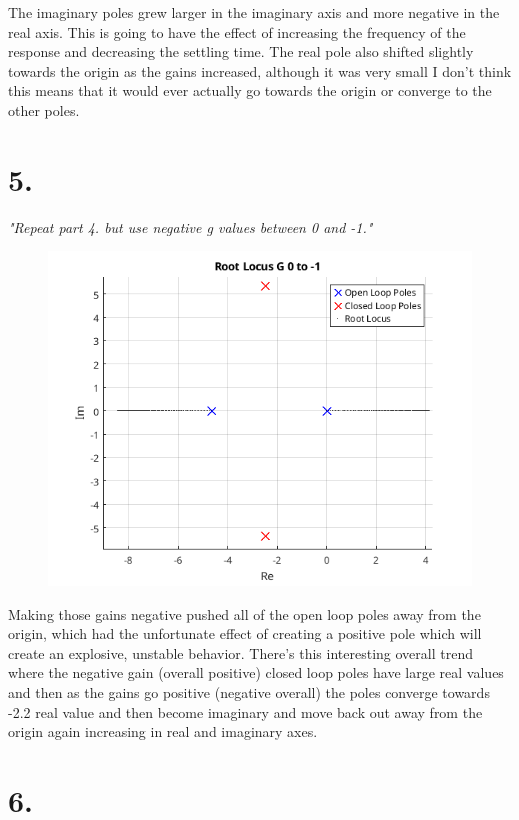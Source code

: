 \documentclass{article}
\begin{document}
The imaginary poles grew larger in the imaginary axis and more negative in the real axis.
This is going to have the effect of increasing the frequency of the response and decreasing the settling time.
The real pole also shifted slightly towards the origin as the gains increased, although it was very small I don't think this means that it would ever actually go towards the origin or converge to the other poles.

\section*{5.}

\textit{
    "Repeat part 4. but use negative g values between 0 and -1."
}

\begin{figure}[H]
    \centering
    \includegraphics[width=\textwidth]{rootLocusNegativeG.png}
\end{figure}

Making those gains negative pushed all of the open loop poles away from the origin, which had the unfortunate effect of creating a positive pole which will create an explosive, unstable behavior.
There's this interesting overall trend where the negative gain (overall positive) closed loop poles have large real values and then as the gains go positive (negative overall) the poles converge towards -2.2 real value and then become imaginary and move back out away from the origin again increasing in real and imaginary axes.

\section*{6.}
\end{document}

